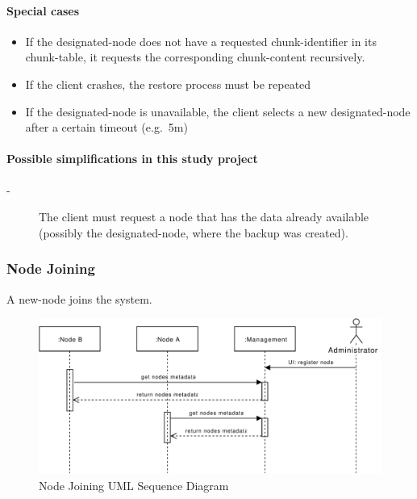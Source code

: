 \paragraph{Special cases}
\begin{itemize}
    \item If the \gls{designated-node} does not have a requested \gls{chunk-identifier} in its \gls{chunk-table}, it requests the corresponding \gls{chunk-content} recursively.
    \item If the \gls{client} crashes, the restore process must be repeated
    \item If the \gls{designated-node} is unavailable, the \gls{client} selects a new \gls{designated-node} after a certain timeout (e.g.\ 5m)
\end{itemize}

\paragraph{Possible simplifications in this study project}
\begin{description}
    \item[-] The \gls{client} must request a \gls{node} that has the data already available (possibly the \gls{designated-node}, where the backup was created).
\end{description}


\subsubsection{Node Joining}\label{sec:scenario-node-join}
A \gls{new-node} joins the \gls{system}.

\begin{figure}[h]
    \centering
    \includegraphics[width=\linewidth]{resources/node_joining.pdf}
    \caption{Node Joining UML Sequence Diagram}
    \label{fig:node-joining}
\end{figure}

